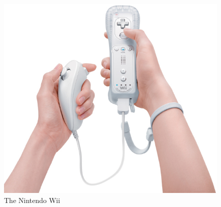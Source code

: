 \begin{figure}[h!]
\begin{center}
\includegraphics[scale=0.3]{nintendowii}
\caption[Nintendo Wii]{The Nintendo Wii}
\label{fig:NintendoWii}
\end{center}
\end{figure}

